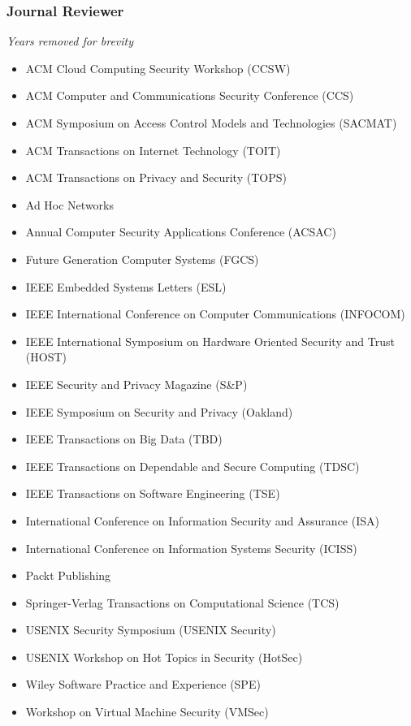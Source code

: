 \hypertarget{journal-reviews}{%
\subsubsection{Journal Reviewer}\label{journal-reviews}}
\small{\textit{Years removed for brevity}}
\begin{itemize}
\tightlist
\item ACM Cloud Computing Security Workshop (CCSW)
\item ACM Computer and Communications Security Conference (CCS)
\item ACM Symposium on Access Control Models and Technologies (SACMAT)
\item ACM Transactions on Internet Technology (TOIT)
\item ACM Transactions on Privacy and Security (TOPS)
\item Ad Hoc Networks
\item Annual Computer Security Applications Conference (ACSAC)
\item Future Generation Computer Systems (FGCS)
\item IEEE Embedded Systems Letters (ESL)
\item IEEE International Conference on Computer Communications (INFOCOM)
\item IEEE International Symposium on Hardware Oriented Security and Trust (HOST)
\item IEEE Security and Privacy Magazine (S\&P)
\item IEEE Symposium on Security and Privacy (Oakland)
\item IEEE Transactions on Big Data (TBD)
\item IEEE Transactions on Dependable and Secure Computing (TDSC)
\item IEEE Transactions on Software Engineering (TSE)
\item International Conference on Information Security and Assurance (ISA)
\item International Conference on Information Systems Security (ICISS)
\item Packt Publishing
\item Springer-Verlag Transactions on Computational Science (TCS)
\item USENIX Security Symposium (USENIX Security)
\item USENIX Workshop on Hot Topics in Security (HotSec)
\item Wiley Software Practice and Experience (SPE)
\item Workshop on Virtual Machine Security (VMSec)
\end{itemize}


